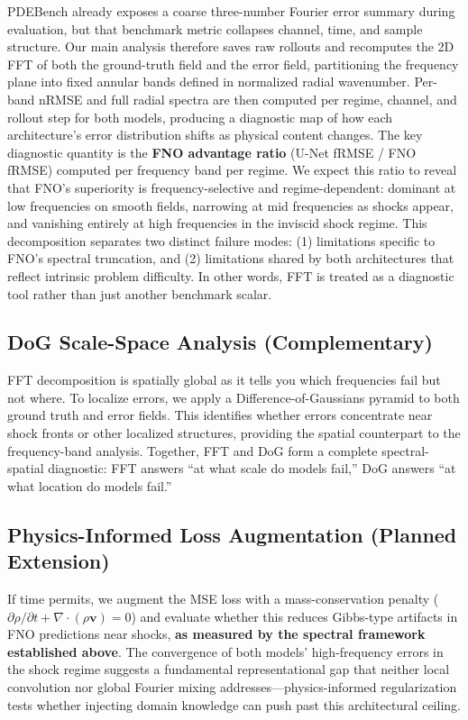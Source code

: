\documentclass{article}
\begin{document}
PDEBench already exposes a coarse three-number Fourier error summary during evaluation, but that benchmark metric collapses channel, time, and sample structure. Our main analysis therefore saves raw rollouts and recomputes the 2D FFT of both the ground-truth field and the error field, partitioning the frequency plane into fixed annular bands defined in normalized radial wavenumber. Per-band nRMSE and full radial spectra are then computed per regime, channel, and rollout step for both models, producing a diagnostic map of how each architecture's error distribution shifts as physical content changes. The key diagnostic quantity is the \textbf{FNO advantage ratio} (U-Net fRMSE / FNO fRMSE) computed per frequency band per regime. We expect this ratio to reveal that FNO's superiority is frequency-selective and regime-dependent: dominant at low frequencies on smooth fields, narrowing at mid frequencies as shocks appear, and vanishing entirely at high frequencies in the inviscid shock regime. This decomposition separates two distinct failure modes: (1) limitations specific to FNO's spectral truncation, and (2) limitations shared by both architectures that reflect intrinsic problem difficulty. In other words, FFT is treated as a diagnostic tool rather than just another benchmark scalar.

\subsection*{DoG Scale-Space Analysis (Complementary)}

FFT decomposition is spatially global as it tells you which frequencies fail but not where. To localize errors, we apply a Difference-of-Gaussians pyramid to both ground truth and error fields. This identifies whether errors concentrate near shock fronts or other localized structures, providing the spatial counterpart to the frequency-band analysis. Together, FFT and DoG form a complete spectral-spatial diagnostic: FFT answers ``at what scale do models fail,'' DoG answers ``at what location do models fail.''

\subsection*{Physics-Informed Loss Augmentation (Planned Extension)}

If time permits, we augment the MSE loss with a mass-conservation penalty ($\partial\rho/\partial t + \nabla \cdot (\rho \mathbf{v}) = 0$) and evaluate whether this reduces Gibbs-type artifacts in FNO predictions near shocks, \textbf{as measured by the spectral framework established above}. The convergence of both models' high-frequency errors in the shock regime suggests a fundamental representational gap that neither local convolution nor global Fourier mixing addresses---physics-informed regularization tests whether injecting domain knowledge can push past this architectural ceiling.
\end{document}
